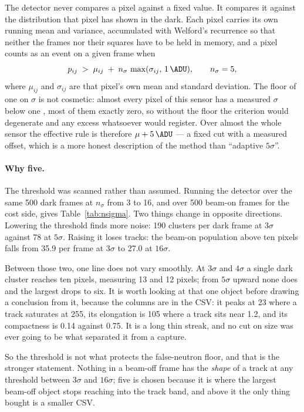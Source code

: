 \documentclass[a4paper,headsepline,oneside,11pt]{scrartcl}
\begin{document}
The detector never compares a pixel against a fixed value. It compares it against
the distribution that pixel has shown in the dark. Each pixel carries its own
running mean and variance, accumulated with Welford's recurrence so that neither
the frames nor their squares have to be held in memory, and a pixel counts as an
event on a given frame when
%
\begin{equation}
  p_{ij} \;>\; \mu_{ij} \;+\; n_\sigma\,\max(\sigma_{ij},\,\SI{1}{\ADU}),
  \qquad n_\sigma = 5,
  \label{eq:threshold}
\end{equation}
%
where $\mu_{ij}$ and $\sigma_{ij}$ are that pixel's own mean and standard
deviation. The floor of one \si{\ADU} on $\sigma$ is not cosmetic: almost every
pixel of this sensor has a measured $\sigma$ below one \si{\ADU}, most of them
exactly zero, so without the floor
the criterion would degenerate and any excess whatsoever would register. Over
almost the whole sensor the effective rule is therefore $\mu + \SI{5}{\ADU}$ --- a fixed
cut with a measured offset, which is a more honest description of the method than
``adaptive $5\sigma$''.

\paragraph{Why five.} The threshold was scanned rather than assumed. Running the
detector over the same 500 dark frames at $n_\sigma$ from 3 to 16, and over 500
beam-on frames for the cost side, gives Table~\ref{tab:nsigma}. Two things
change in opposite directions. Lowering the threshold finds more noise: 190
clusters per dark frame at $3\sigma$ against 78 at $5\sigma$. Raising it loses
tracks: the beam-on population above ten pixels falls from 35.9 per frame at
$3\sigma$ to 27.0 at $16\sigma$.

Between those two, one line does not vary smoothly. At $3\sigma$ and $4\sigma$ a
single dark cluster reaches ten pixels, measuring 13 and 12 pixels; from
$5\sigma$ upward none does and the largest drops to six. It is worth looking at
that one object before drawing a conclusion from it, because the columns are in
the CSV: it peaks at \SI{23}{\ADU} where a track saturates at 255, its
elongation is 105 where a track sits near 1.2, and its compactness is 0.14
against 0.75. It is a long thin streak, and no cut on size was ever going to be
what separated it from a capture.

So the threshold is not what protects the false-neutron floor, and that is the
stronger statement. Nothing in a beam-off frame has the \emph{shape} of a track
at any threshold between $3\sigma$ and $16\sigma$; five is chosen because it is
where the largest beam-off object stops reaching into the track band, and above
it the only thing bought is a smaller CSV.
\end{document}
